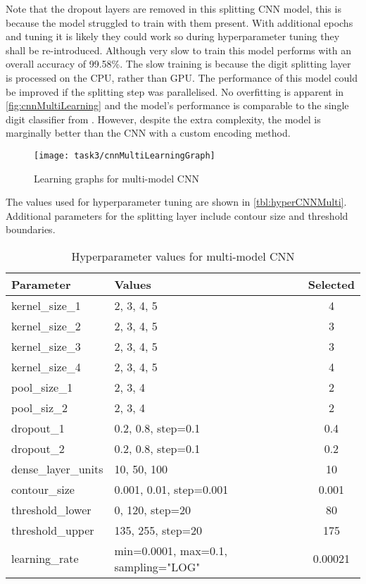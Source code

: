 Note that the dropout layers are removed in this splitting CNN model, this is because the model struggled to train with them present. With additional epochs and tuning it is likely they could work so during hyperparameter tuning they shall be re-introduced. Although very slow to train this model performs with an overall accuracy of 99.58\%. The slow training is because the digit splitting layer is processed on the CPU, rather than GPU. The performance of this model could be improved if the splitting step was parallelised. No overfitting is apparent in \autoref{fig:cnnMultiLearning} and the model's performance is comparable to the single digit classifier from \autocite{biswasEfficientCNNModel2021}. However, despite the extra complexity, the model is marginally better than the CNN with a custom encoding method.

\begin{figure}[!htbp]
    \centering
    \texttt{[image: task3/cnnMultiLearningGraph]}
    \caption[Learning graphs for multi-model CNN]
    {Learning graphs for multi-model CNN}
    \label{fig:cnnMultiLearning}
\end{figure}

The values used for hyperparameter tuning are shown in \autoref{tbl:hyperCNNMulti}. Additional parameters for the splitting layer include contour size and threshold boundaries.

\bgroup
    \begin{table}[!htbp]
        \centering
        \begin{tabular}{ll|c}
            \hline
            Parameter & Values & Selected \\ \hline
            kernel\_size\_1 & 2, 3, 4, 5 & 4 \\
            kernel\_size\_2 & 2, 3, 4, 5 & 3 \\
            kernel\_size\_3 & 2, 3, 4, 5 & 3 \\
            kernel\_size\_4 & 2, 3, 4, 5 & 4 \\
            pool\_size\_1 & 2, 3, 4 & 2 \\
            pool\_siz\_2 & 2, 3, 4 & 2 \\
            dropout\_1 & 0.2, 0.8, step=0.1 & 0.4 \\
            dropout\_2 & 0.2, 0.8, step=0.1 & 0.2 \\
            dense\_layer\_units & 10, 50, 100 & 10 \\
            contour\_size & 0.001, 0.01, step=0.001 & 0.001 \\
            threshold\_lower & 0, 120, step=20 & 80 \\
            threshold\_upper & 135, 255, step=20 & 175 \\
            learning\_rate & min=0.0001, max=0.1, sampling="LOG" & 0.00021 \\
        \end{tabular}
        \caption{Hyperparameter values for multi-model CNN}
        \label{tbl:hyperCNNMulti}
    \end{table}
\egroup

